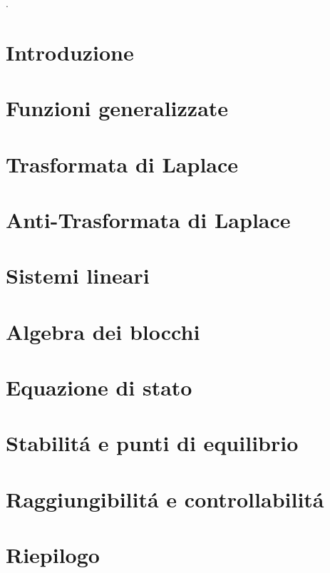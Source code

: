 \documentclass{report}
\begin{document}
	
	
	
	\titleTdS
	\pagebreak
	.%
	\pagebreak
	\tableofcontents
	\listofexercises
	\pagebreak
	
	\chapter{Introduzione}
		
	\pagebreak
	\chapter{Funzioni generalizzate}
	
	\pagebreak
	\chapter{Trasformata di Laplace}
	
	\pagebreak
	\chapter{Anti-Trasformata di Laplace}
	
	\pagebreak
	\chapter{Sistemi lineari}
	
	
	
	
	
	\pagebreak
	\chapter{Algebra dei blocchi}
	
	
	\pagebreak
	\chapter{Equazione di stato}
	
	\pagebreak
	\chapter{Stabilit\'a e punti di equilibrio}
	
	\pagebreak
	\chapter{Raggiungibilit\'a e controllabilit\'a}
	
	\pagebreak
	\chapter{Riepilogo}
	
\end{document}

